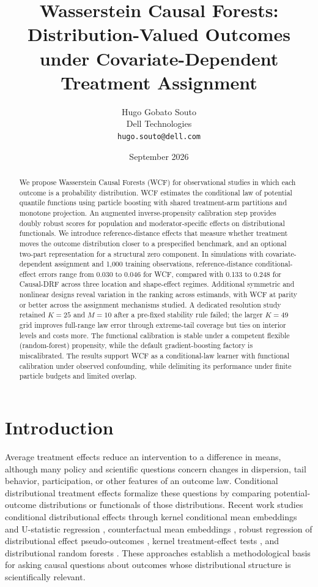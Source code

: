 \documentclass[11pt]{article}
\title{Wasserstein Causal Forests: Distribution-Valued Outcomes\\ under Covariate-Dependent Treatment Assignment}
\author{Hugo Gobato Souto\\ Dell Technologies\\ \texttt{hugo.souto@dell.com}}
\date{September 2026}
\begin{document}
\maketitle

\begin{abstract}
We propose Wasserstein Causal Forests (WCF) for observational studies in which each outcome is a probability distribution. WCF estimates the conditional law of potential quantile functions using particle boosting with shared treatment-arm partitions and monotone projection. An augmented inverse-propensity calibration step provides doubly robust scores for population and moderator-specific effects on distributional functionals. We introduce reference-distance effects that measure whether treatment moves the outcome distribution closer to a prespecified benchmark, and an optional two-part representation for a structural zero component. In simulations with covariate-dependent assignment and 1,000 training observations, reference-distance conditional-effect errors range from 0.030 to 0.046 for WCF, compared with 0.133 to 0.248 for Causal-DRF across three location and shape-effect regimes. Additional symmetric and nonlinear designs reveal variation in the ranking across estimands, with WCF at parity or better across the assignment mechanisms studied. A dedicated resolution study retained $K=25$ and $M=10$ after a pre-fixed stability rule failed; the larger $K=49$ grid improves full-range law error through extreme-tail coverage but ties on interior levels and costs more. The functional calibration is stable under a competent flexible (random-forest) propensity, while the default gradient-boosting factory is miscalibrated. The results support WCF as a conditional-law learner with functional calibration under observed confounding, while delimiting its performance under finite particle budgets and limited overlap.
\end{abstract}

\section{Introduction}\label{sec:intro}

Average treatment effects reduce an intervention to a difference in means, although many policy and scientific questions concern changes in dispersion, tail behavior, participation, or other features of an outcome law. Conditional distributional treatment effects formalize these questions by comparing potential-outcome distributions or functionals of those distributions. Recent work studies conditional distributional effects through kernel conditional mean embeddings and U-statistic regression \citep{CATEGeneralization}, counterfactual mean embeddings \citep{Counterfactualmeanembeddings}, robust regression of distributional effect pseudo-outcomes \citep{GRFDistributionalCausalEffects}, kernel treatment-effect tests \citep{martineztaboada2023efficient}, and distributional random forests \citep{DRF-paper,naf2026causaldrf}. These approaches establish a methodological basis for asking causal questions about outcomes whose distributional structure is scientifically relevant.
\end{document}
